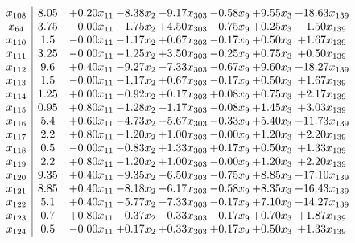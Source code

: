 \documentclass[8pt]{article}
\begin{document}
\[\begin{array}{c| c c@{\hskip 2pt} c@{\hskip 2pt} c@{\hskip 2pt} c@{\hskip 2pt} c@{\hskip 2pt} c@{\hskip 2pt} }
 x_{108}   &  8.05 & +  0.20 x_{11} & -8.38 x_{2} & -9.17 x_{303} & -0.58 x_{9} & +  9.55 x_{3} & + 18.63 x_{139}\\
 x_{64}   &  3.75 & -0.00 x_{11} & -1.75 x_{2} & +  4.50 x_{303} & -0.75 x_{9} & +  0.25 x_{3} & -1.50 x_{139}\\
 x_{110}   &  1.5 & -0.00 x_{11} & -1.17 x_{2} & +  0.67 x_{303} & -0.17 x_{9} & +  0.50 x_{3} & +  1.67 x_{139}\\
 x_{111}   &  3.25 & -0.00 x_{11} & -1.25 x_{2} & +  3.50 x_{303} & -0.25 x_{9} & +  0.75 x_{3} & +  0.50 x_{139}\\
 x_{112}   &  9.6 & +  0.40 x_{11} & -9.27 x_{2} & -7.33 x_{303} & -0.67 x_{9} & +  9.60 x_{3} & + 18.27 x_{139}\\
 x_{113}   &  1.5 & -0.00 x_{11} & -1.17 x_{2} & +  0.67 x_{303} & -0.17 x_{9} & +  0.50 x_{3} & +  1.67 x_{139}\\
 x_{114}   &  1.25 & +  0.00 x_{11} & -0.92 x_{2} & +  0.17 x_{303} & +  0.08 x_{9} & +  0.75 x_{3} & +  2.17 x_{139}\\
 x_{115}   &  0.95 & +  0.80 x_{11} & -1.28 x_{2} & -1.17 x_{303} & -0.08 x_{9} & +  1.45 x_{3} & +  3.03 x_{139}\\
 x_{116}   &  5.4 & +  0.60 x_{11} & -4.73 x_{2} & -5.67 x_{303} & -0.33 x_{9} & +  5.40 x_{3} & + 11.73 x_{139}\\
 x_{117}   &  2.2 & +  0.80 x_{11} & -1.20 x_{2} & +  1.00 x_{303} & -0.00 x_{9} & +  1.20 x_{3} & +  2.20 x_{139}\\
 x_{118}   &  0.5 & -0.00 x_{11} & -0.83 x_{2} & +  1.33 x_{303} & +  0.17 x_{9} & +  0.50 x_{3} & +  1.33 x_{139}\\
 x_{119}   &  2.2 & +  0.80 x_{11} & -1.20 x_{2} & +  1.00 x_{303} & -0.00 x_{9} & +  1.20 x_{3} & +  2.20 x_{139}\\
 x_{120}   &  9.35 & +  0.40 x_{11} & -9.35 x_{2} & -6.50 x_{303} & -0.75 x_{9} & +  8.85 x_{3} & + 17.10 x_{139}\\
 x_{121}   &  8.85 & +  0.40 x_{11} & -8.18 x_{2} & -6.17 x_{303} & -0.58 x_{9} & +  8.35 x_{3} & + 16.43 x_{139}\\
 x_{122}   &  5.1 & +  0.40 x_{11} & -5.77 x_{2} & -7.33 x_{303} & -0.17 x_{9} & +  7.10 x_{3} & + 14.27 x_{139}\\
 x_{123}   &  0.7 & +  0.80 x_{11} & -0.37 x_{2} & -0.33 x_{303} & -0.17 x_{9} & +  0.70 x_{3} & +  1.87 x_{139}\\
 x_{124}   &  0.5 & -0.00 x_{11} & +  0.17 x_{2} & +  0.33 x_{303} & +  0.17 x_{9} & +  0.50 x_{3} & +  1.33 x_{139}\\

\end{array}\]
\end{document}
